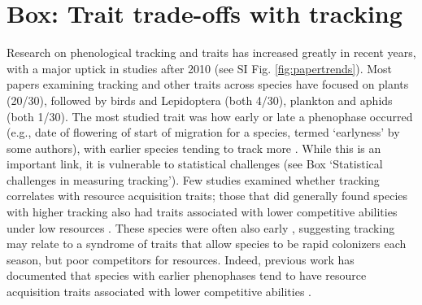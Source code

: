 \documentclass[11pt,letterpaper]{article}
\begin{document}
\section{Box: Trait trade-offs with tracking} %
Research on phenological tracking and traits has increased greatly in recent years, with a major uptick in studies after 2010 (see SI Fig. \ref{fig:papertrends}). Most papers examining tracking and other traits across species have focused on plants (20/30), followed by birds and Lepidoptera (both 4/30), plankton and aphids (both 1/30). The most studied trait was how early or late a phenophase occurred (e.g., date of flowering of start of migration for a species, termed `earlyness' by some authors), with earlier species tending to track more \citep[studies included both birds and Lepidotera,][]{Diamond:2011nx,Ishioka2013,kharouba2014,jing2016,du2017}. While this is an important link, it is vulnerable to statistical challenges (see Box `Statistical challenges in measuring tracking'). Few studies examined whether tracking correlates with resource acquisition traits; those that did generally found species with higher tracking also had traits associated with lower competitive abilities under low resources \citep[e.g., being shallower or lacking a taproot rooted][]{Dorji2013,lasky2016,Zhu2016BioLetters}. These species were often also early \citep[e.g.,][]{Dorji2013,Zhu2016BioLetters}, suggesting tracking may relate to a syndrome of traits that allow species to be rapid colonizers each season, but poor competitors for resources. Indeed, previous work has documented that species with earlier phenophases tend to have resource acquisition traits associated with lower competitive abilities \citep[e.g., they tend to be of lower height, have shallower roots, narrower diameter vessels, thinner leaves, and grow faster, reviewed in][]{wolkovich2014aob}. %
\end{document}
